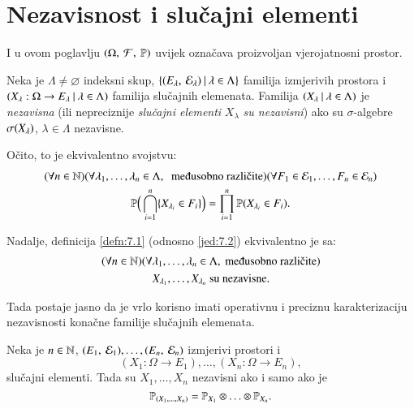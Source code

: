 
\chapter{Nezavisnost i slu\v cajni elementi}

I u ovom poglavlju $(\Omega, \: \mathcal{F}, \: \mathbb{P})$ uvijek ozna\v cava proizvoljan vjerojatnosni prostor.

\begin{defn}   \label{defn:7.1}
    Neka je $\Lambda \neq \varnothing$ indeksni skup, $\{{({E_\lambda}, \: {\mathcal{E}_\lambda})} \: | \: {\lambda \in \Lambda}\}$ familija izmjerivih prostora i $({X_\lambda : \Omega \to E_\lambda} \: | \: {\lambda \in \Lambda})$ familija slu\v cajnih elemenata.
    Familija $({X_\lambda} \: | \: {\lambda \in \Lambda})$ je \emph{nezavisna} (ili nepreciznije \emph{slu\v cajni elementi} $X_\lambda$ \emph{su nezavisni}) ako su $\sigma$-algebre $\sigma({X_\lambda})$, $\lambda \in \Lambda$ nezavisne.
\end{defn}

O\v cito, to je ekvivalentno svojstvu:
\begin{equation}    \label{jed:7.2}
    \begin{gathered}
        (\forall n \in \nat) (\forall \lambda_1, \ldots, \lambda_n \in \Lambda, \; \textnormal{ me\dj usobno razli\v cite}) (\forall F_1 \in \famE_1, \ldots, F_n \in \famE_n)\\ 
        \masP \Big( \presjek{i = 1}{n} \{ X_{\lambda_i} \in F_i \} \Big) = \produkt{i = 1}{n} \vjeroj{X_{\lambda_i} \in F_i}.
    \end{gathered}
\end{equation}

Nadalje, definicija \ref{defn:7.1} (odnosno \eqref{jed:7.2}) ekvivalentno je sa:
\begin{equation}    \label{jed:7.3}
    \begin{gathered}
        (\forall n \in \nat) (\forall \lambda_1, \ldots, \lambda_n \in \Lambda, \textnormal{ me\dj usobno razli\v cite})\\
        X_{\lambda_1}, \ldots, X_{\lambda_n} \textnormal{ su nezavisne}.
    \end{gathered}
\end{equation}

Tada postaje jasno da je vrlo korisno imati operativnu i preciznu karakterizaciju nezavisnosti kona\v cne familije slu\v cajnih elemenata.

\begin{tm}  \label{tm:7.4}
    Neka je $n \in \mathbb{N}$, $({E_1}, \: {\mathcal{E}_1}), \ldots, ({E_n}, \: {\mathcal{E}_n})$ izmjerivi prostori i
    \begin{equation*}
        (X_1 : \Omega \to E_1), \ldots, (X_n : \Omega \to E_n),    
    \end{equation*}
    slu\v cajni elementi.
    Tada su $X_1, \ldots, X_n$ nezavisni ako i samo ako je
    \begin{equation*}
        \mathbb{P}_{({X}_1, \ldots, {X}_n)} = \mathbb{P}_{X_1} \otimes \ldots \otimes \mathbb{P}_{X_n}.
    \end{equation*}
\end{tm}

